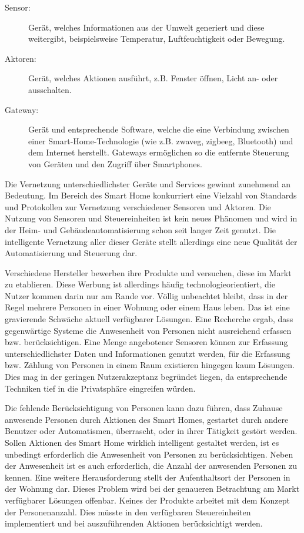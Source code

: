 \documentclass[12pt, oneside, smallheadings]{scrbook}
\begin{document}
\begin{description}
	\item[Sensor:] Gerät, welches Informationen aus der Umwelt generiert und diese weitergibt, beispielsweise Temperatur, Luftfeuchtigkeit oder Bewegung.
	\item[Aktoren:] Gerät, welches Aktionen ausführt, z.B. Fenster öffnen, Licht an- oder ausschalten.
	\item[Gateway:] Gerät und entsprechende Software, welche die eine Verbindung zwischen einer Smart-Home-Technologie (wie z.B. \gls{zwaveg}, \gls{zigbeeg}, Bluetooth) und dem Internet herstellt. Gateways ermöglichen so die entfernte Steuerung von Geräten und den Zugriff über Smartphones.
\end{description}

Die Vernetzung unterschiedlichster Geräte und Services gewinnt zunehmend an Bedeutung. Im Bereich des Smart Home konkurriert eine Vielzahl von Standards und Protokollen zur Vernetzung verschiedener Sensoren und Aktoren. Die Nutzung von Sensoren und Steuereinheiten ist kein neues Phänomen und wird in der Heim- und Gebäudeautomatisierung schon seit langer Zeit genutzt. Die intelligente Vernetzung aller dieser Geräte stellt allerdings eine neue Qualität der Automatisierung und Steuerung dar.

Verschiedene Hersteller bewerben ihre Produkte und versuchen, diese im Markt zu etablieren. Diese Werbung ist allerdings häufig technologieorientiert, die Nutzer kommen darin nur am Rande vor. Völlig unbeachtet bleibt, dass in der Regel mehrere Personen in einer Wohnung oder einem Haus leben. Das ist eine gravierende Schwäche aktuell verfügbarer Lösungen. Eine Recherche ergab, dass gegenwärtige Systeme die Anwesenheit von Personen nicht ausreichend erfassen bzw. berücksichtigen. Eine Menge angebotener Sensoren können zur Erfassung unterschiedlichster Daten und Informationen genutzt werden, für die Erfassung bzw. Zählung von Personen in einem Raum existieren hingegen kaum Lösungen. Dies mag in der geringen Nutzerakzeptanz begründet liegen, da entsprechende Techniken tief in die Privatsphäre eingreifen würden.

Die fehlende Berücksichtigung von Personen kann dazu führen, dass Zuhause anwesende Personen durch Aktionen des Smart Homes, gestartet durch andere Benutzer oder Automatismen, überrascht, oder in ihrer Tätigkeit gestört werden. Sollen Aktionen des Smart Home wirklich intelligent gestaltet werden, ist es unbedingt erforderlich die Anwesenheit von Personen zu berücksichtigen. Neben der Anwesenheit ist es auch erforderlich, die Anzahl der anwesenden Personen zu kennen. Eine weitere Herausforderung stellt der Aufenthaltsort der Personen in der Wohnung dar. Dieses Problem wird bei der genaueren Betrachtung am Markt verfügbarer Lösungen offenbar. Keines der Produkte arbeitet mit dem Konzept der Personenanzahl. Dies müsste in den verfügbaren Steuereinheiten implementiert und bei auszuführenden Aktionen berücksichtigt werden.
\end{document}
